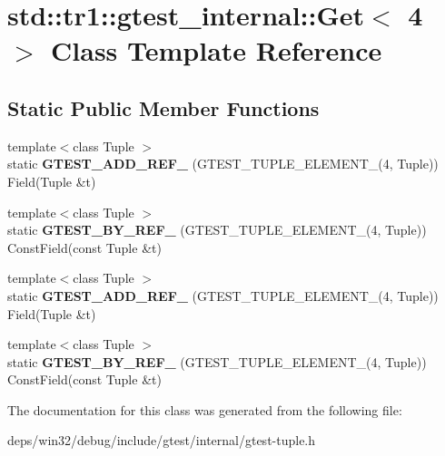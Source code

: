 \hypertarget{classstd_1_1tr1_1_1gtest__internal_1_1_get_3_014_01_4}{}\section{std\+:\+:tr1\+:\+:gtest\+\_\+internal\+:\+:Get$<$ 4 $>$ Class Template Reference}
\label{classstd_1_1tr1_1_1gtest__internal_1_1_get_3_014_01_4}
\subsection*{Static Public Member Functions}
\begin{DoxyCompactItemize}
\item 
\hypertarget{classstd_1_1tr1_1_1gtest__internal_1_1_get_3_014_01_4_a5c7a91c681118bb7253e305f8ff42be4}{}{\footnotesize template$<$class Tuple $>$ }\\static {\bfseries G\+T\+E\+S\+T\+\_\+\+A\+D\+D\+\_\+\+R\+E\+F\+\_\+} (G\+T\+E\+S\+T\+\_\+\+T\+U\+P\+L\+E\+\_\+\+E\+L\+E\+M\+E\+N\+T\+\_\+(4, Tuple)) Field(Tuple \&t)\label{classstd_1_1tr1_1_1gtest__internal_1_1_get_3_014_01_4_a5c7a91c681118bb7253e305f8ff42be4}

\item 
\hypertarget{classstd_1_1tr1_1_1gtest__internal_1_1_get_3_014_01_4_a04794c398bbe81e4de0915b79da2166a}{}{\footnotesize template$<$class Tuple $>$ }\\static {\bfseries G\+T\+E\+S\+T\+\_\+\+B\+Y\+\_\+\+R\+E\+F\+\_\+} (G\+T\+E\+S\+T\+\_\+\+T\+U\+P\+L\+E\+\_\+\+E\+L\+E\+M\+E\+N\+T\+\_\+(4, Tuple)) Const\+Field(const Tuple \&t)\label{classstd_1_1tr1_1_1gtest__internal_1_1_get_3_014_01_4_a04794c398bbe81e4de0915b79da2166a}

\item 
\hypertarget{classstd_1_1tr1_1_1gtest__internal_1_1_get_3_014_01_4_a5c7a91c681118bb7253e305f8ff42be4}{}{\footnotesize template$<$class Tuple $>$ }\\static {\bfseries G\+T\+E\+S\+T\+\_\+\+A\+D\+D\+\_\+\+R\+E\+F\+\_\+} (G\+T\+E\+S\+T\+\_\+\+T\+U\+P\+L\+E\+\_\+\+E\+L\+E\+M\+E\+N\+T\+\_\+(4, Tuple)) Field(Tuple \&t)\label{classstd_1_1tr1_1_1gtest__internal_1_1_get_3_014_01_4_a5c7a91c681118bb7253e305f8ff42be4}

\item 
\hypertarget{classstd_1_1tr1_1_1gtest__internal_1_1_get_3_014_01_4_a04794c398bbe81e4de0915b79da2166a}{}{\footnotesize template$<$class Tuple $>$ }\\static {\bfseries G\+T\+E\+S\+T\+\_\+\+B\+Y\+\_\+\+R\+E\+F\+\_\+} (G\+T\+E\+S\+T\+\_\+\+T\+U\+P\+L\+E\+\_\+\+E\+L\+E\+M\+E\+N\+T\+\_\+(4, Tuple)) Const\+Field(const Tuple \&t)\label{classstd_1_1tr1_1_1gtest__internal_1_1_get_3_014_01_4_a04794c398bbe81e4de0915b79da2166a}

\end{DoxyCompactItemize}


The documentation for this class was generated from the following file\+:\begin{DoxyCompactItemize}
\item 
deps/win32/debug/include/gtest/internal/gtest-\/tuple.\+h\end{DoxyCompactItemize}
